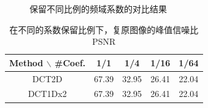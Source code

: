 \documentclass[12pt,a4paper]{article}
\begin{document}
\begin{figure}[H]
    \centering
    \caption{保留不同比例的频域系数的对比结果}
    \label{fig:keep_rate}
\end{figure}

\begin{table}[H]
    \centering
    \caption{在不同的系数保留比例下，复原图像的峰值信噪比PSNR}
    \label{tab:keep_rate_psnr}
    \begin{tabular}{c|cccc}
        \toprule
        Method $\backslash$ \#Coef. & 1/1 & 1/4 & 1/16 & 1/64\tabularnewline
        \midrule
        DCT2D & 67.39 & 32.95 & 26.41 & 22.04\tabularnewline
        DCT1Dx2 & 67.39 & 32.95 & 26.41 & 22.04\tabularnewline
        \bottomrule
    \end{tabular}
\end{table}
\end{document}
